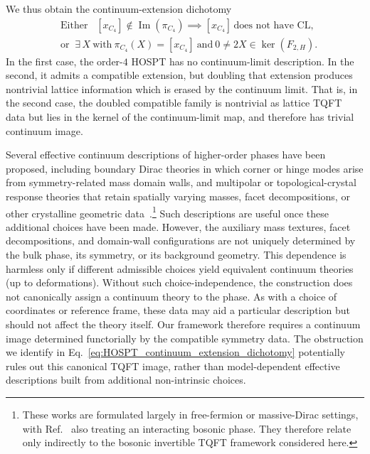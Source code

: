 \documentclass[aps,prx,reprint,superscriptaddress,twocolumn,amsmath,amssymb,amsfonts, nofootinbib]{revtex4-2}
\theoremstyle{apsstyle}
\begin{document}
\noindent We thus obtain the continuum-extension dichotomy
\begin{equation}
\begin{aligned}
&\text{Either}\;\;\;[x_{C_{4}}]\notin\operatorname{Im}(\pi_{C_4}) \implies [x_{C_{4}}]\, \text{does not have CL},\\
&\text{or}\;\;\exists\,X\ \text{with}\ 
\pi_{C_4}(X)=[x_{C_{4}}]
\ \text{and}\ 
0\neq2X\in\ker(F_{2,H}).
\end{aligned}
\label{eq:HOSPT_continuum_extension_dichotomy}
\end{equation}
In the first case, the order-$4$ HOSPT has no continuum-limit description. In the second, it admits a compatible extension, but doubling that extension produces nontrivial lattice information which is erased by the continuum limit. 
That is, in the second case, the doubled compatible family is nontrivial as lattice TQFT data but lies in the kernel of the continuum-limit map, and therefore has trivial continuum image.

\bigskip 

Several effective continuum descriptions of higher-order phases have been proposed, including boundary Dirac theories in which corner or hinge modes arise from symmetry-related mass domain walls, and multipolar or topological-crystal response theories that retain spatially varying masses, facet decompositions, or other crystalline geometric data~\cite{Khalaf2018,You2021,Huang2022}.\footnote{These works are formulated largely in free-fermion or massive-Dirac settings, with Ref.~\cite{You2021} also treating an interacting bosonic phase. They therefore relate only indirectly to the bosonic invertible TQFT framework considered here.} Such descriptions are useful once these additional choices have been made. However, the auxiliary mass textures, facet decompositions, and domain-wall configurations are not uniquely determined by the bulk phase, its symmetry, or its background geometry. This dependence is harmless only if different admissible choices yield equivalent continuum theories (up to deformations). Without such choice-independence, the construction does not canonically assign a continuum theory to the phase. As with a choice of coordinates or reference frame, these data may aid a particular description but should not affect the theory itself. Our framework therefore requires a continuum image determined functorially by the compatible symmetry data. The obstruction we identify in Eq.~\ref{eq:HOSPT_continuum_extension_dichotomy} potentially rules out this canonical TQFT image, rather than model-dependent effective descriptions built from additional non-intrinsic choices.
\end{document}
